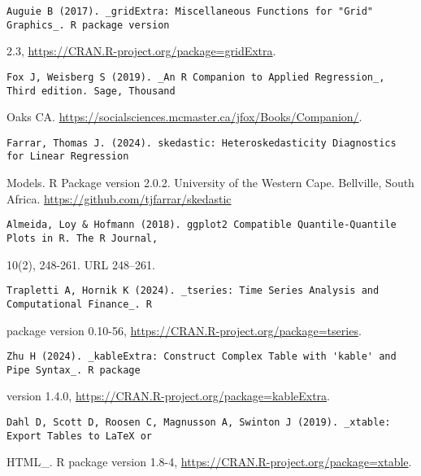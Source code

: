 \documentclass[
]{article}
\begin{document}
\begin{verbatim}
Auguie B (2017). _gridExtra: Miscellaneous Functions for "Grid" Graphics_. R package version
\end{verbatim}

2.3, \url{https://CRAN.R-project.org/package=gridExtra}.

\begin{verbatim}
Fox J, Weisberg S (2019). _An R Companion to Applied Regression_, Third edition. Sage, Thousand
\end{verbatim}

Oaks CA. \url{https://socialsciences.mcmaster.ca/jfox/Books/Companion/}.

\begin{verbatim}
Farrar, Thomas J. (2024). skedastic: Heteroskedasticity Diagnostics for Linear Regression
\end{verbatim}

Models. R Package version 2.0.2. University of the Western Cape.
Bellville, South Africa. \url{https://github.com/tjfarrar/skedastic}

\begin{verbatim}
Almeida, Loy & Hofmann (2018). ggplot2 Compatible Quantile-Quantile Plots in R. The R Journal,
\end{verbatim}

10(2), 248-261. URL 248--261.

\begin{verbatim}
Trapletti A, Hornik K (2024). _tseries: Time Series Analysis and Computational Finance_. R
\end{verbatim}

package version 0.10-56,
\url{https://CRAN.R-project.org/package=tseries}.

\begin{verbatim}
Zhu H (2024). _kableExtra: Construct Complex Table with 'kable' and Pipe Syntax_. R package
\end{verbatim}

version 1.4.0, \url{https://CRAN.R-project.org/package=kableExtra}.

\begin{verbatim}
Dahl D, Scott D, Roosen C, Magnusson A, Swinton J (2019). _xtable: Export Tables to LaTeX or
\end{verbatim}

HTML\_. R package version 1.8-4,
\url{https://CRAN.R-project.org/package=xtable}.
\end{document}
